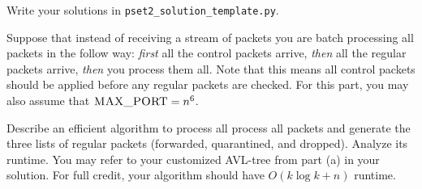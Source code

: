 \documentclass[12pt,twoside]{article}
\begin{document}
\begin{problems}
\begin{problemparts}
Write your solutions in \texttt{pset2\_solution\_template.py}.

\problempart {}
Suppose that instead of receiving a stream of packets you are batch processing all packets in the follow way: \textit{first} all the control packets arrive, \textit{then} all the regular packets arrive, \textit{then} you process them all. Note that this means all control packets should be applied before any regular packets are checked. For this part, you may also assume that $\textsc{MAX\_PORT}=n^6$.

Describe an efficient algorithm to process all process all packets and generate the three lists of regular packets (forwarded, quarantined, and dropped). Analyze its runtime. You may refer to your customized AVL-tree from part (a) in your solution. For full credit, your algorithm should have $O(k\log{k} + n)$ runtime.


\end{problemparts}

\end{problems}
\end{document}
